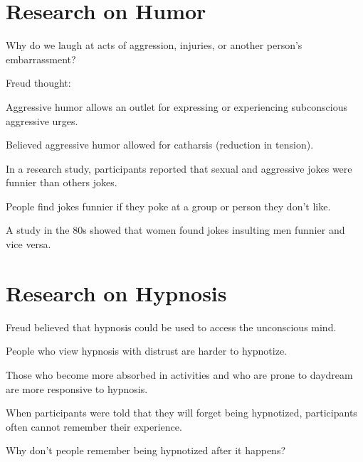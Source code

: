 \section{Research on Humor}

\begin{coloredlist}
    \item Why do we laugh at acts of aggression, injuries, or another person's embarrassment?
    \item Freud thought:
    \begin{coloredlist}
        \item Aggressive humor allows an outlet for expressing or experiencing subconscious aggressive urges.
        \item Believed aggressive humor allowed for catharsis (reduction in tension).
    \end{coloredlist}
    \item In a research study, participants reported that sexual and aggressive jokes were funnier than others jokes.
    \item People find jokes funnier if they poke at a group or person they don't like.
    \item A study in the 80s showed that women found jokes insulting men funnier and vice versa.
\end{coloredlist}

\section{Research on Hypnosis}

\begin{coloredlist}
    \item Freud believed that hypnosis could be used to access the unconscious mind.
    \item People who view hypnosis with distrust are harder to hypnotize.
    \item Those who become more absorbed in activities and who are prone to daydream are more responsive to hypnosis.
    \item When participants were told that they will forget being hypnotized, participants often cannot remember their experience.
    \item Why don't people remember being hypnotized after it happens?
\end{coloredlist}